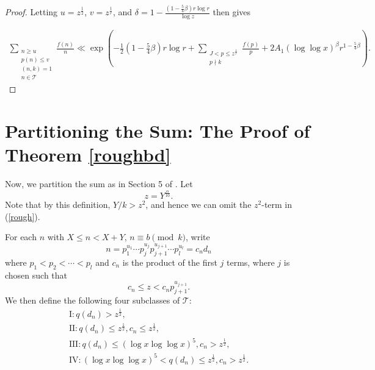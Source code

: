 \documentclass{amsart}
\begin{document}
\begin{proof}
Letting $u=z^\frac 12$, $v=z^\frac 1r$, and $\delta=1-\frac{(1-\frac 54\beta )r\log r}{\log z}$ then gives

\begin{align*}
\sum_{\substack{n\geq u \\ p(n)\leq v \\ (n,k)=1 \\ n\in \mathcal T}}\frac{f(n)}{n}\ll \exp\left(-\frac 12\left(1-\frac 54\beta \right)r\log r+\sum_{\substack{J<p\leq z^\frac 1r \\ p\nmid k}}\frac{f(p)}{p}+2A_1 (\log\log x)^{\beta}r^{1-\frac 54\beta }\right).
\end{align*}
\end{proof}

\section{Partitioning the Sum: The Proof of Theorem \ref{roughbd}}
Now, we partition the sum as in Section 5 of \cite{Sh}.  Let 
$$z=Y^{\frac{\alpha}{10}}.$$
Note that by this definition, $Y/k>z^2$, and hence we can omit the $z^2$-term in (\ref{rough}).

For each $n$ with $X\leq n<X+Y$, $n\equiv b\pmod k$, write
$$n=p_1^{u_1} \cdots  p_j^{u_j}p_{j+1}^{u_{j+1}}\cdots p_l^{u_l}=c_nd_n$$
where $p_1<p_2<\cdots <p_l$ and $c_n$ is the product of the first $j$ terms, where $j$ is chosen such that
$$c_n\leq z<c_np_{j+1}^{u_{j+1}}.$$
We then define the following four subclasses of $\mathcal T$:
\begin{gather*}
\mbox{I}:q(d_n)>z^\frac 12,\\
\mbox{II}:q(d_n)\leq z^\frac 12,c_n\leq z^\frac 12,\\
\mbox{III}:q(d_n)\leq \left(\log x\log \log x\right)^5,c_n>z^\frac 12,\\
\mbox{IV}:\left(\log x\log \log x\right)^5<q(d_n)\leq z^\frac 12,c_n>z^\frac 12.
\end{gather*}
\end{document}
